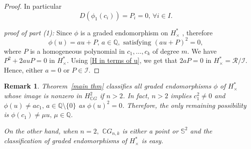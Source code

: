 \documentclass{amsart}
\newtheorem{remark}[theorem]{Remark}
\newcommand{\thmref}[1]{Theorem~\ref{#1}}
\begin{document}
\begin{proof}
In particular $$D(\phi_1(c_i))=P_i=0, \, \forall i \in I.$$
		
		\textit{proof of part (1):} Since %
$\phi$ is a graded endomorphism on $H^*_{\times}$%
, therefore $$\phi(u) = a u + P, \, a \in \mathbb{Q}, \text{ satisfying } (a u + P)^2 =0,$$ where %
$P$ is a homogeneous polynomial in $c_1, \dots, c_k$ of degree $m$. We have $P^2 + 2 a u P =0$ in $H^*_{\times}$. Using \eqref{H in terms of u}, we get that $2aP =0$ in $H^*_{\times}=\mathcal{R}/\mathcal{I}$. Hence, either $a=0$ or $P\in \mathcal{I}$.
	\end{proof}
	
	
		\begin{remark}
			\thmref{main thm} classifies all graded endomorphisms $\phi$ of $H^*_\times$ whose image is nonzero in $H^2_{\mathbb CG}$ if $n>2$. In fact, $n>2$ implies $c_1^2\neq 0$ and $\phi(u) \neq ac_1,\, a \in \mathbb{Q}\setminus\{0\}$ as $\phi(u)^2=0$. Therefore, the only remaining possibility is $\phi(c_1)\neq \mu u,\, \mu \in \mathbb Q.$ 
			
			On the other hand, when $n=2,$ $\mathbb CG_{n,k}$ is either a point %
or $\mathbb S^2$ and %
the classification of graded endomorphisms of $H^*_\times$ is easy.
		\end{remark}
	
\end{document}
